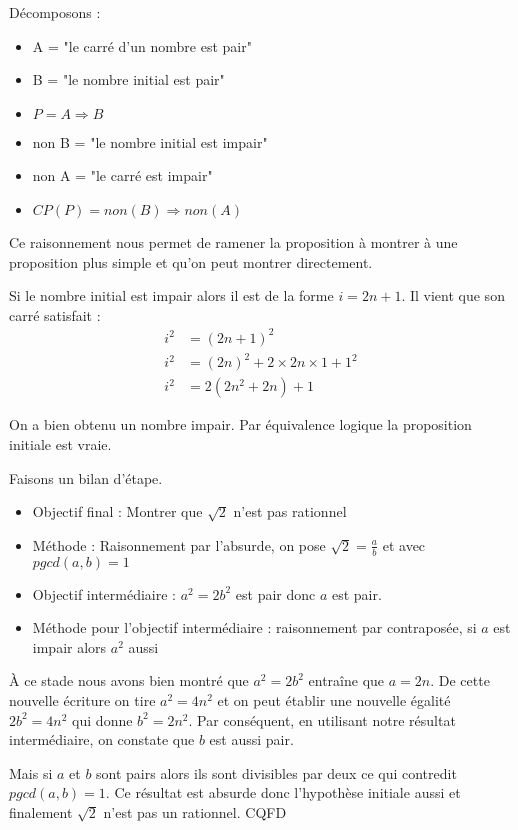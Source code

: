 \documentclass[11pt]{article}
\begin{document}
Décomposons :
\begin{itemize}
\item A = "le carré d'un nombre est pair"
\item B = "le nombre initial est pair"
\item \(P = A\Rightarrow B\)
\item non B = "le nombre initial est impair"
\item non A = "le carré est impair"
\item \(CP(P) = non(B)\Rightarrow non(A)\)
\end{itemize}

Ce raisonnement nous permet de ramener la proposition à montrer à
une proposition plus simple et qu'on peut montrer directement.

Si le nombre initial est impair alors il est de la forme \(i = 2n +
   1\). Il vient que son carré satisfait :
\begin{align*}
i^2 &= (2n + 1)^2\\
i^2 &= (2n)^2 + 2\times 2n\times 1 + 1^2\\
i^2 &= 2(2n^2 + 2n) + 1
\end{align*}

On a bien obtenu un nombre impair. Par équivalence logique la
proposition initiale est vraie.

Faisons un bilan d'étape.
\begin{itemize}
\item Objectif final : Montrer que \(\sqrt{2}\) n'est pas rationnel
\item Méthode : Raisonnement par l'absurde, on pose \(\sqrt{2} =
     \frac{a}{b}\) et avec \(pgcd(a, b) = 1\)
\item Objectif intermédiaire : \(a^2 = 2b^2\) est pair donc \(a\) est pair.
\item Méthode pour l'objectif intermédiaire : raisonnement par
contraposée, si \(a\) est impair alors \(a^2\) aussi
\end{itemize}

À ce stade nous avons bien montré que \(a^2 = 2b^2\) entraîne que
\(a = 2n\). De cette nouvelle écriture on tire \(a^2 = 4n^2\) et on
peut établir une nouvelle égalité \(2b^2 = 4n^2\) qui donne \(b^2 =
   2n^2\). Par conséquent, en utilisant notre résultat intermédiaire,
on constate que \(b\) est aussi pair.

Mais si \(a\) et \(b\) sont pairs alors ils sont divisibles par deux ce
qui contredit \(pgcd(a, b) = 1\). Ce résultat est absurde donc
l'hypothèse initiale aussi et finalement \(\sqrt{2}\) n'est pas un
rationnel. CQFD
\end{document}

